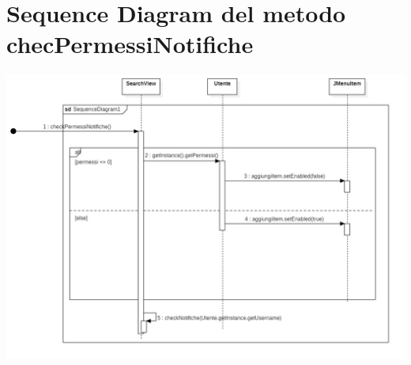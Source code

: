 \section{Sequence Diagram del metodo checPermessiNotifiche}
\includegraphics[scale=0.28]{Immagini/checkPermNot_SD.jpg}
